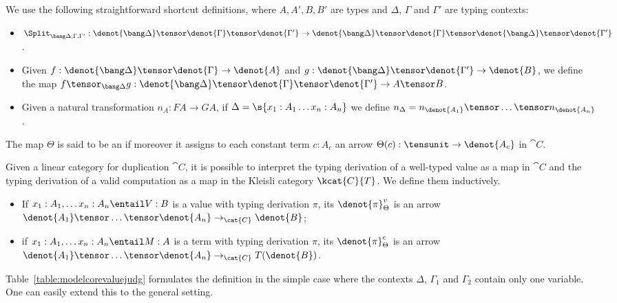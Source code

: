 \documentclass{llncs}
\begin{document}
We use the following straightforward shortcut definitions, where
$A,A',B,B'$ are types and $\Delta$, $\Gamma$ and $\Gamma'$ are typing contexts:
\begin{itemize}
\item $\Split_{\bang\Delta,\Gamma,\Gamma'}:\denot{\bang\Delta}
  \tensor\denot{\Gamma}\tensor\denot{\Gamma'}
  \to \denot{\bang\Delta}\tensor\denot{\Gamma}\tensor
  \denot{\bang\Delta}\tensor\denot{\Gamma'}$.
\item Given $f : \denot{\bang\Delta}\tensor\denot{\Gamma}\to\denot{A}$
  and $g : \denot{\bang\Delta}\tensor\denot{\Gamma'}\to\denot{B}$, we
  define the map
  $f\tensor_{\bang\Delta}g:\denot{\bang\Delta}
  \tensor\denot{\Gamma}\tensor\denot{\Gamma'} \to
  A\tensor B$.
\item Given a natural transformation $n_A:FA\to GA$, if
  $\Delta=\s{x_1:A_1\ldots x_n:A_n}$ we define
  $n_{\Delta}=n_{\denot{A_1}}\tensor\ldots\tensor n_{\denot{A_n}}$.
\end{itemize} 

\begin{definition}\label{def:langdenot}\rm
  The map $\Theta$ is said to be an  if moreover it assigns to each constant term $c:A_c$ an
  arrow $\Theta(c):\tensunit\to \denot{A_c}$ in $\cat{C}$.
  
  Given a linear category for duplication $\cat{C}$, it is possible to
  interpret the typing derivation of a well-typed value as a map in
  $\cat{C}$ and the typing derivation of a valid computation as a map
  in the Kleisli category $\kcat{C}{T}$. We define them inductively.
  \begin{itemize}
  \item
    If $x_1:A_1,\ldots x_n:A_n\entail V:B$ is a value with
    typing derivation $\pi$, its 
    $\denot{\pi}_\Theta^v$ is an arrow
    $\denot{A_1}\tensor\ldots\tensor\denot{A_n}\to_{\cat{C}}
    \denot{B}$;
  \item
    if $x_1:A_1,\ldots x_n:A_n\entail M:A$ is a term with typing
    derivation $\pi$, its 
    $\denot{\pi}_\Theta^c$ is an arrow
    $\denot{A_1}\tensor\ldots\tensor\denot{A_n}\to_{\cat{C}}
    T(\denot{B})$.
  \end{itemize}
  Table~\ref{table:modelcorevaluejudg} formulates the definition in
  the simple case where the contexts $\Delta$, $\Gamma_1$ and
  $\Gamma_2$ contain only one variable. One can easily extend this
  to the general setting. 
\end{definition}
\end{document}
